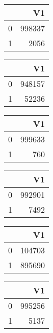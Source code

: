 \bigskip\bigskip
\centering
\begin{tabular}{rr}
  \hline
 & V1 \\ 
  \hline
0 & 998337 \\ 
  1 & 2056 \\ 
   \hline
\end{tabular}

\bigskip\bigskip
\centering
\begin{tabular}{rr}
  \hline
 & V1 \\ 
  \hline
0 & 948157 \\ 
  1 & 52236 \\ 
   \hline
\end{tabular}

\bigskip\bigskip
\centering
\begin{tabular}{rr}
  \hline
 & V1 \\ 
  \hline
0 & 999633 \\ 
  1 & 760 \\ 
   \hline
\end{tabular}

\bigskip\bigskip
\centering
\begin{tabular}{rr}
  \hline
 & V1 \\ 
  \hline
0 & 992901 \\ 
  1 & 7492 \\ 
   \hline
\end{tabular}

\bigskip\bigskip
\centering
\begin{tabular}{rr}
  \hline
 & V1 \\ 
  \hline
0 & 104703 \\ 
  1 & 895690 \\ 
   \hline
\end{tabular}

\bigskip\bigskip
\centering
\begin{tabular}{rr}
  \hline
 & V1 \\ 
  \hline
0 & 995256 \\ 
  1 & 5137 \\ 
   \hline
\end{tabular}

